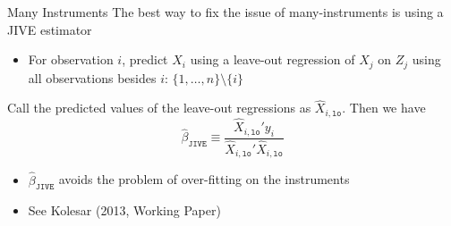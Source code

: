 \documentclass[aspectratio=169,t,11pt,table]{beamer}
\begin{document}
\begin{frame}{Many Instruments}
  The best way to fix the issue of many-instruments is using a JIVE estimator
  \begin{itemize}
    \item For observation $i$, predict $X_i$ using a leave-out regression of $X_j$ on $Z_j$ using all observations besides $i$: $\{ 1, \dots, n \} \setminus \{ i \}$
  \end{itemize}

  \pause
  \bigskip
  Call the predicted values of the leave-out regressions as $\hat{X}_{i, \texttt{lo}}$. Then we have 
  $$
    \hat{\beta}_{\texttt{JIVE}} \equiv \frac{\hat{X}_{i, \texttt{lo}}' y_i}{\hat{X}_{i, \texttt{lo}}' \hat{X}_{i, \texttt{lo}}}
  $$

  \begin{itemize}
    \item $\hat{\beta}_{\texttt{JIVE}}$ avoids the problem of over-fitting on the instruments 
    
    \item See Kolesar (2013, Working Paper)
  \end{itemize}
\end{frame}

% 
% 
\end{document}
